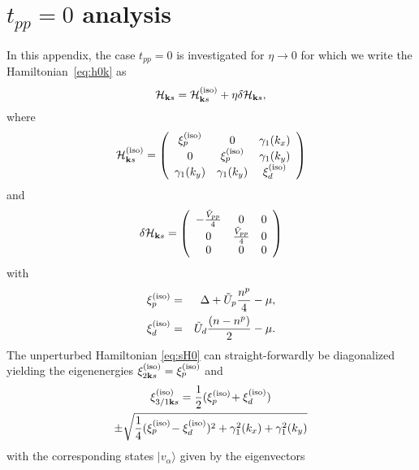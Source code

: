 \documentclass[prb, twocolumn,showpacs,preprintnumbers,amsmath,amssymb, floatfix]{revtex4}
\begin{document}
\section{$t_{pp}=0$ analysis}
\label{app:tpp0}
In this appendix, the case $t_{pp}=0$ is investigated for $\eta\rightarrow 0$ for which we write the Hamiltonian~\eqref{eq:h0k} as 
\begin{equation}
  \mathcal{H}_{{\bf k} s} = \mathcal{H}^{({\rm iso})}_{{\bf k} s} + \eta \delta \mathcal{H}_{{\bf k} s},
  \label{eq:applinH}
\end{equation}
where
\begin{equation}
  \mathcal{H}^{({\rm iso})}_{{\bf k} s} = \left(\begin{array}{ccc} \xi^{({\rm iso})}_p & 0 & \gamma_{1}(k_x) \\ 0 & \xi^{({\rm iso})}_p & \gamma_{1}(k_y)\\ \gamma_{1}(k_y)& \gamma_{1}(k_y)&\xi^{({\rm iso})}_{d} \end{array}\right)
  \label{eq:sH0}
\end{equation}
and 
\begin{equation}
  \delta\mathcal{H}_{{\bf k} s} = \left(\begin{array}{ccc} -\frac{\tilde{V}_{pp}}{4} & 0 & 0 \\ 0 & \frac{\tilde{V}_{pp}}{4} & 0 \\ 0 & 0 &0 \end{array}\right)
  \label{eq:sdH}
\end{equation}
with 
\begin{eqnarray}
  \xi^{({\rm iso})}_p &=& \Delta + \tilde{U}_{p} \frac{n^{p}}{4} - \mu,\\
  \xi^{({\rm iso})}_{d} &=& \tilde{U}_{d} \frac{(n-n^p)}{2} - \mu.
  \label{eqn:diagtpp0}
\end{eqnarray}
The unperturbed Hamiltonian \eqref{eq:sH0} can straight-forwardly be diagonalized yielding the eigenenergies $\xi_{2 {\bf k} s}^{({\rm iso})} = \xi^{({\rm iso})}_{p}$ and 
\begin{multline}
  \xi_{3/1 {\bf k} s}^{({\rm iso})} =  \frac12(\xi^{({\rm iso})}_{p}\! + \xi^{({\rm iso})}_{d})\\
  \pm \sqrt{\frac14(\xi^{({\rm iso})}_{p}\! - \xi^{({\rm iso})}_{d})^2 + \gamma_{1}^2(k_x) + \gamma_{1}^{2}(k_y)}
  \label{eq:e0}
\end{multline}
with the corresponding states $|v_{\alpha}\rangle$ given by the eigenvectors
\end{document}
